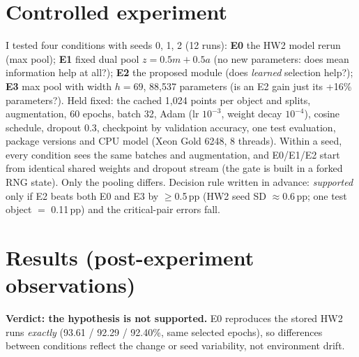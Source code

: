 \documentclass[10pt]{article}
\begin{document}
\section{Controlled experiment}
I tested four conditions with seeds 0, 1, 2 (12 runs): \textbf{E0} the HW2 model rerun (max pool); \textbf{E1} fixed dual pool $z=0.5m+0.5a$ (no new parameters: does mean information help at all?); \textbf{E2} the proposed module (does \emph{learned} selection help?); \textbf{E3} max pool with width $h{=}69$, 88{,}537 parameters (is an E2 gain just its +16\% parameters?).
Held fixed: the cached 1{,}024 points per object and splits, augmentation, 60 epochs, batch 32, Adam (lr $10^{-3}$, weight decay $10^{-4}$), cosine schedule, dropout 0.3, checkpoint by validation accuracy, one test evaluation, package versions and CPU model (Xeon Gold 6248, 8 threads).
Within a seed, every condition sees the same batches and augmentation, and E0/E1/E2 start from identical shared weights and dropout stream (the gate is built in a forked RNG state). Only the pooling differs.
Decision rule written in advance: \emph{supported} only if E2 beats both E0 and E3 by $\ge$0.5\,pp (HW2 seed SD $\approx$0.6\,pp; one test object $=$ 0.11\,pp) and the critical-pair errors fall.

\section{Results (post-experiment observations)}
\textbf{Verdict: the hypothesis is not supported.} E0 reproduces the stored HW2 runs \emph{exactly} (93.61 / 92.29 / 92.40\%, same selected epochs), so differences between conditions reflect the change or seed variability, not environment drift.
\end{document}
